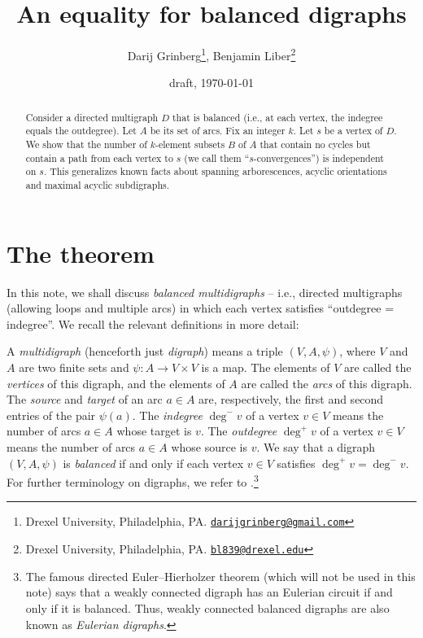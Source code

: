 \documentclass[numbers=enddot,12pt,final,onecolumn,notitlepage]{scrartcl}%
\theoremstyle{definition}
\theoremstyle{plainsl}
\begin{document}
\title{An equality for balanced digraphs}
\author{Darij Grinberg\thanks{Drexel University, Philadelphia, PA.
\href{mailto:darijgrinberg@gmail.com}{\texttt{darijgrinberg@gmail.com}}},
Benjamin Liber\thanks{Drexel University, Philadelphia, PA.
\href{mailto:bl839@drexel.edu}{\texttt{bl839@drexel.edu}}}}
\date{draft, \today}
\maketitle

\begin{abstract}
Consider a directed multigraph $D$ that is balanced (i.e., at each vertex, the
indegree equals the outdegree). Let $A$ be its set of arcs. Fix an integer
$k$. Let $s$ be a vertex of $D$. We show that the number of $k$-element
subsets $B$ of $A$ that contain no cycles but contain a path from each vertex
to $s$ (we call them \textquotedblleft$s$-convergences\textquotedblright) is
independent on $s$. This generalizes known facts about spanning arborescences,
acyclic orientations and maximal acyclic subdigraphs.

\end{abstract}

\section{The theorem}

In this note, we shall discuss \emph{balanced multidigraphs} -- i.e., directed
multigraphs (allowing loops and multiple arcs) in which each vertex satisfies
\textquotedblleft outdegree = indegree\textquotedblright. We recall the
relevant definitions in more detail:

A \emph{multidigraph} (henceforth just \emph{digraph}) means a triple
$(V,A,\psi)$, where $V$ and $A$ are two finite sets and $\psi:A\rightarrow
V\times V$ is a map. The elements of $V$ are called the \emph{vertices} of
this digraph, and the elements of $A$ are called the \emph{arcs} of this
digraph. The \emph{source} and \emph{target} of an arc $a\in A$ are,
respectively, the first and second entries of the pair $\psi(a)$. The
\emph{indegree} $\deg^{-}v$ of a vertex $v\in V$ means the number of arcs
$a\in A$ whose target is $v$. The \emph{outdegree} $\deg^{+}v$ of a vertex
$v\in V$ means the number of arcs $a\in A$ whose source is $v$. We say that a
digraph $(V,A,\psi)$ is \emph{balanced} if and only if each vertex $v\in V$
satisfies $\deg^{+}v=\deg^{-}v$. For further terminology on digraphs, we refer
to \cite{22s}.\footnote{The famous directed Euler--Hierholzer theorem (which
will not be used in this note) says that a weakly connected digraph has an
Eulerian circuit if and only if it is balanced. Thus, weakly connected
balanced digraphs are also known as \emph{Eulerian digraphs}.}
\end{document}

